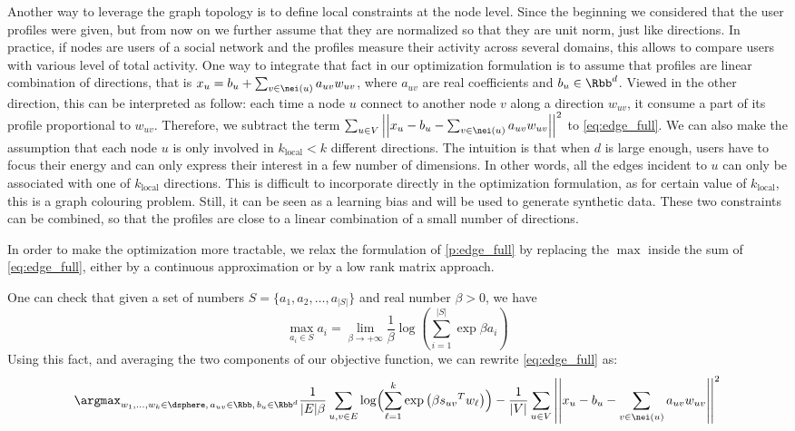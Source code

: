 Another way to leverage the graph topology is to define local constraints at the node level. Since
the beginning we considered that the user profiles were given, but from now on we further assume
that they are normalized so that they are unit norm, just like directions. In practice, if nodes are
users of a social network and the profiles measure their activity across several domains, this
allows to compare users with various level of total activity. One way to integrate that fact in
our optimization formulation is to assume that profiles are linear combination of directions, that
is $x_u = b_u + \sum_{v \in \nei(u)} a_{uv} w_{uv}$, where $a_{uv}$ are real coefficients and $b_u
\in \Rbb^d$. Viewed in the other direction, this can be interpreted as follow: each time a node $u$
connect to another node $v$ along a direction $w_{uv}$, it consume a part of its profile
proportional to $w_{uv}$. Therefore, we subtract the term $\sum_{u\in V} \left|\left| x_u - b_u -
\sum_{v \in \nei(u)} a_{uv} w_{uv} \right|\right|^2$ to \eqref{eq:edge_full}.
%
We can also make the assumption that each node $u$ is only involved in $k_\mathrm{local} < k$
different directions. The intuition is that when $d$ is large enough, users have to focus their
energy and can only express their interest in a few number of dimensions. In other words, all the
edges incident to $u$ can only be associated with one of $k_\mathrm{local}$ directions. This is
difficult to incorporate directly in the optimization formulation, as for certain value of
$k_\mathrm{local}$, this is a \NPc{} graph colouring problem. Still, it can be seen as a learning
bias and will be used to generate synthetic data.
These two constraints can be combined, so that the profiles are close to a linear combination of a
small number of directions.


\bigskip

In order to make the optimization more tractable, we relax the formulation of \autoref{p:edge_full}
by replacing the $\max$ inside the sum of \eqref{eq:edge_full}, either by a continuous approximation
or by a low rank matrix approach.

One can check that given a set of numbers $S=\{a_1, a_2, \ldots, a_{|S|}\}$ and real number $\beta >
0$, we have
\begin{equation*}
  \max_{a_i \in S} a_i = \lim_{\beta \rightarrow + \infty} \frac{1}{\beta}
  \log\left( \sum_{i=1}^{|S|} \exp{\beta a_i} \right)
\end{equation*}
Using this fact, and averaging the two components of our objective function, we can rewrite
\eqref{eq:edge_full} as:
\begin{equation}
  \argmax_{w_1,\ldots,w_k \in \dsphere,\, a_{uv}\in\Rbb,\, b_u \in \Rbb^d}
  \frac{1}{|E|\beta} \sum_{u,v\in E}
  \log\Bigl(\sum_{\ell=1}^k\exp\left(\beta {s_{uv}}^T w_\ell \right)\Bigr)
  - \frac{1}{|V|}\sum_{u\in V}
  \left|\left| x_u - b_u - \sum_{v \in \nei(u)} a_{uv} w_{uv} \right|\right|^2
\end{equation}

